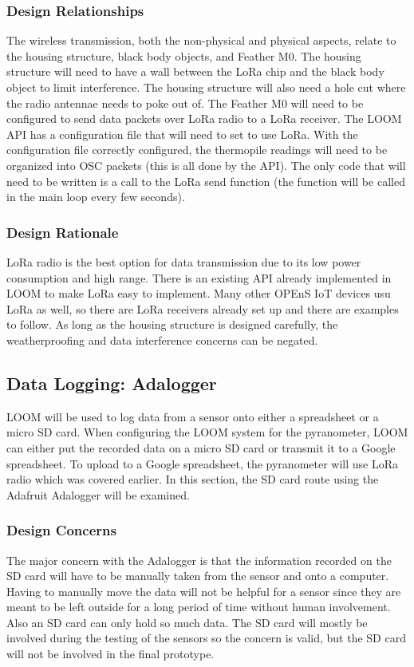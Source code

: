 \documentclass[10pt,draftclsnofoot,onecolumn,letterpaper]{article}
\begin{document}
\subsubsection{Design Relationships}
The wireless transmission, both the non-physical and physical aspects, relate to the housing structure, black body objects, and Feather M0. The housing structure will need to have a wall between the LoRa chip and the black body object to limit interference. The housing structure will also need a hole cut where the radio antennae needs to poke out of. The Feather M0 will need to be configured to send data packets over LoRa radio to a LoRa receiver. The LOOM API has a configuration file that will need to set to use LoRa. With the configuration file correctly configured, the thermopile readings will need to be organized into OSC packets (this is all done by the API). The only code that will need to be written is a call to the LoRa send function (the function will be called in the main loop every few seconds). 
\subsubsection{Design Rationale}
LoRa radio is the best option for data transmission due to its low power consumption and high range. There is an existing API already implemented in LOOM to make LoRa easy to implement. Many other OPEnS IoT devices usu LoRa as well, so there are LoRa receivers already set up and there are examples to follow. As long as the housing structure is designed carefully, the weatherproofing and data interference concerns can be negated.

\subsection{Data Logging: Adalogger}
LOOM will be used to log data from a sensor onto either a spreadsheet or a micro SD card. When configuring the LOOM system for the pyranometer, LOOM can either put the recorded data on a micro SD card or transmit it to a Google spreadsheet. To upload to a Google spreadsheet, the pyranometer will use LoRa radio which was covered earlier. In this section, the SD card route using the Adafruit Adalogger will be examined. 

\subsubsection{Design Concerns}
The major concern with the Adalogger is that the information recorded on the SD card will have to be manually taken from the sensor and onto a computer. Having to manually move the data will not be helpful for a sensor since they are meant to be left outside for a long period of time without human involvement. Also an SD card can only hold so much data. The SD card will mostly be involved during the testing of the sensors so the concern is valid, but the SD card will not be involved in the final prototype.
\end{document}
